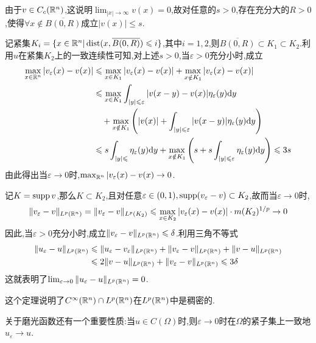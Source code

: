 由于$v\in C_{c}(\mathbb{R} ^n)$,这说明$\lim_{|x|\to\infty}v(x)=0$,故对任意的$s>0$,存在充分大的$R>0$,使得$\forall x\notin \overline{B(0,R)}$成立$|v(x)|\leqslant s$.\par
记紧集$K_{i}=\{x\in\mathbb{R} ^n|\operatorname{dist}(x,\overline{B(0,R)})\leqslant i\}$,其中$i=1,2$,则$\overline{B(0,R)}\subset K_1\subset K_2$.利用$u$在紧集$K_2$上的一致连续性可知,对上述$s>0$,当$\varepsilon>0$充分小时,成立
$$
\begin{aligned}
    \max_{x\in\mathbb{R}^n}|v_{\varepsilon}(x)-v(x)| &\leqslant \max_{x\in K_1}|v_{\varepsilon}(x)-v(x)|+\max_{x\notin K_1}|v_{\varepsilon}(x)-v(x)|\\
                                             &\leqslant \max_{x\in K_1}\int_{|y|\leqslant \varepsilon}|v(x-y)-v(x)|\eta _{\varepsilon}(y)\mathrm{d} y\\
                                             &\quad +\max_{x\notin K_1}\left(|v(x)|+\int_{|y|\leqslant \varepsilon}|v(x-y)|\eta _{\varepsilon}(y)\mathrm{d} y\right)\\
                                             &\leqslant s\int_{|y|\leqslant}\eta_{\varepsilon}(y)\mathrm{d} y+\max_{x\notin K_1}\left(s+s\int_{|y|\leqslant \varepsilon}\eta _{\varepsilon}(y)\mathrm{d} y\right)\leqslant 3s    
\end{aligned}
$$
由此得出当$\varepsilon\to 0$时,$\max_{\mathbb{R} ^n}|v_{\varepsilon}(x)-v(x)\to 0$.\par
记$K=\operatorname{supp} v$,那么$K\subset K_2$,且对任意$\varepsilon\in (0,1),\operatorname{supp} (v_{\varepsilon}-v)\subset K_2$,故而当$\varepsilon\to 0$时,
$$
\|v_{\varepsilon}-v\|_{L^p(\mathbb{R} ^n)}=\|v_{\varepsilon}-v\|_{L^p(K_2)}\leqslant \max_{x\in K_2}|v_{\varepsilon}(x)-v(x)|\cdot m(K_2)^{1/p}\to 0
$$
因此,当$\varepsilon>0$充分小时,成立$\|v_{\varepsilon}-v\|_{L^p(\mathbb{R} ^n)}\leqslant \delta$.利用三角不等式
$$
\begin{aligned}
    \|u_{\varepsilon}-u\|_{L^p(\mathbb{R}^n)} &\leqslant \|u_{\varepsilon}-v_{\varepsilon}\|_{L^p(\mathbb{R}^n)}+\|v_{\varepsilon}-v\|_{L^p(\mathbb{R}^n)}+\|v-u\|_{L^p(\mathbb{R}^n)}\\
                                      &\leqslant 2 \|v-u\|_{L^p(\mathbb{R}^n)}+\|v_{\varepsilon}-v\|_{L^p(\mathbb{R}^n)}\leqslant 3\delta
\end{aligned}
$$
这就表明了$\lim_{\varepsilon\to 0}\|u_{\varepsilon}-u\|_{L^p(\mathbb{R} ^n)}=0$.\par
这个定理说明了$C^{\infty}(\mathbb{R}^n)\cap L^p(\mathbb{R}^n)$在$L^p(\mathbb{R}^n)$中是稠密的.\par
关于磨光函数还有一个重要性质:当$u\in C(\Omega)$时,则$\varepsilon\to 0$时在$\Omega$的紧子集上一致地$u_{\varepsilon}\to u$.\par
